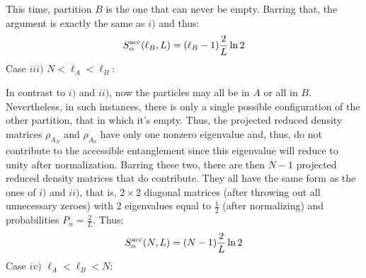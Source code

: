 This time, partition $B$ is the one that can never be empty. Barring that, the argument is exactly the same as $i)$ and thus:
%
\begin{equation}
S_{\alpha}^{\rm acc} (\ell_{B}, L) = (\ell_{B} - 1) \frac{2}{L} \ln{2}
\end{equation}
%
Case $iii)$ $N < \ell_{A} < \ell_{B}$:

In contrast to $i)$ and $ii)$, now the particles may all be in $A$ or all in $B$. Nevertheless, in such instances, there is only a single possible configuration of the other partition, that in which it's empty. Thus, the projected reduced density matrices $\rho_{A_N}$ and $\rho_{A_0}$ have only one nonzero eigenvalue and, thus, do not contribute to the accessible entanglement since this eigenvalue will reduce to unity after normalization. Barring these two, there are then $N-1$ projected reduced density matrices that do contribute. They all have the same form as the ones of $i)$ and $ii)$, that is, $2 \times 2$ diagonal matrices (after throwing out all unnecessary zeroes) with 2 eigenvalues equal to $\frac{1}{2}$ (after normalizing) and probabilities $P_n = \frac{2}{L}$. Thus:
%
\begin{equation}
S_{\alpha}^{\rm acc} (N, L) = (N - 1) \frac{2}{L} \ln{2}
\end{equation}
%
Case $iv)$ $\ell_{A} < \ell_{B} < N$:

